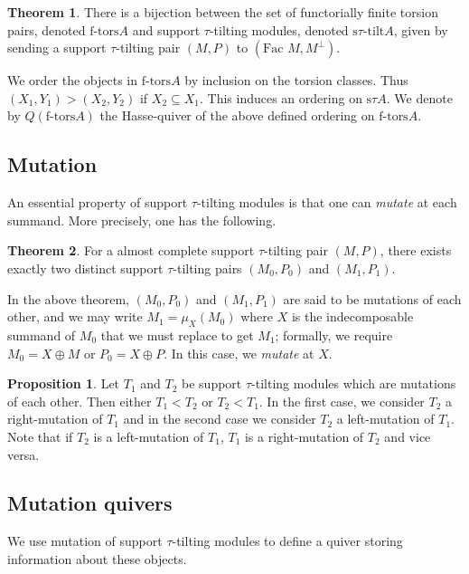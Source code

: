 \documentclass[]{article}
\theoremstyle{definition}
\newtheorem{theorem}{Theorem}[section]
\newtheorem{proposition}{Proposition}[section]
\newcommand{\tu}{\ensuremath{\tau}}
\newcommand{\Fac}{\ensuremath{\text{Fac }}}
\begin{document}
\begin{theorem}\cite[Theorem 2.7]{tau}\cite{auslandersmalo81}
	There is a bijection between the set of functorially finite torsion pairs, denoted $\text{f-tors} A$ and support \tu-tilting modules, denoted $\text{s}\tu\text{-tilt} A$, given by sending a support \tu-tilting pair $(M,P)$ to $(\Fac M,M^\perp)$.
\end{theorem}

We order the objects in $\text{f-tors} A$ by inclusion on the torsion classes. Thus $(X_1,Y_1) > (X_2,Y_2)$ if $X_2 \subseteq X_1$. This induces an ordering on $\text{s}\tu A$. We denote by $Q(\text{f-tors} A)$ the Hasse-quiver of the above defined ordering on $\text{f-tors} A$.

\subsection{Mutation}
An essential property of support \tu-tilting modules is that one can \textit{mutate} at each summand. More precisely, one has the following.

\begin{theorem}
	For a almost complete support $\tau$-tilting pair $(M,P)$, there exists exactly two distinct support \tu-tilting pairs $(M_0,P_0)$ and $(M_1,P_1)$.
\end{theorem}

In the above theorem, $(M_0,P_0)$ and $(M_1,P_1)$ are said to be mutations of each other, and we may write $M_1 = \mu_X(M_0)$ where $X$ is the indecomposable summand of $M_0$ that we must replace to get $M_1$; formally, we require $M_0 = X \oplus M$ or $P_0 = X \oplus P$. In this case, we \textit{mutate} at $X$.

\begin{proposition}\cite[Definition-Proposition 2.28]{tau}
	Let $T_1$ and $T_2$ be support \tu-tilting modules which are mutations of each other. Then either $T_1 < T_2$ or $T_ 2 < T_1$. In the first case, we consider $T_2$ a right-mutation of $T_1$ and in the second case we consider $T_2$ a left-mutation of $T_1$. Note that if $T_2$ is a left-mutation of $T_1$, $T_1$ is a right-mutation of $T_2$ and vice versa.
\end{proposition}

\subsection{Mutation quivers}
We use mutation of support \tu-tilting modules to define a quiver storing information about these objects.
\end{document}
